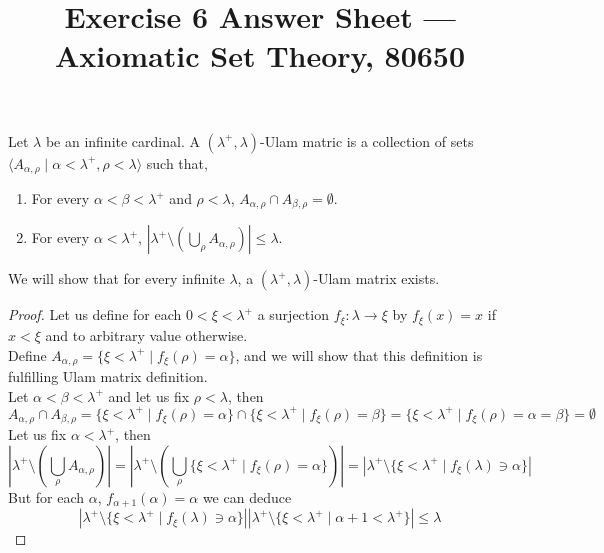 
\title{Exercise 6 Answer Sheet --- Axiomatic Set Theory, 80650}


\maketitle
\maketitleprint{}

\question{}
Let $\lambda$ be an infinite cardinal.
A $(\lambda^+, \lambda)$-Ulam matric is a collection of sets $\langle A_{\alpha, \rho} \mid \alpha < \lambda^+, \rho < \lambda \rangle$ such that,
\begin{enumerate}
	\item For every $\alpha < \beta < \lambda^+$ and $\rho < \lambda$, $A_{\alpha, \rho} \cap A_{\beta, \rho} = \emptyset$.
	\item For every $\alpha < \lambda^+$, $|\lambda^+ \setminus (\bigcup_\rho A_{\alpha, \rho})| \le \lambda$.
\end{enumerate}

\subquestion{}
We will show that for every infinite $\lambda$, a $(\lambda^+, \lambda)$-Ulam matrix exists.
\begin{proof}
	Let us define for each $0 < \xi < \lambda^+$ a surjection $f_\xi : \lambda \to \xi$ by $f_\xi(x) = x$ if $x < \xi$ and to arbitrary value otherwise. \\
	Define $A_{\alpha, \rho} = \{ \xi < \lambda^+ \mid f_\xi(\rho) = \alpha \}$, and we will show that this definition is fulfilling Ulam matrix definition. \\
	Let $\alpha < \beta < \lambda^+$ and let us fix $\rho < \lambda$, then
	\[
		A_{\alpha, \rho} \cap A_{\beta, \rho}
		= \{ \xi < \lambda^+ \mid f_\xi(\rho) = \alpha \} \cap \{ \xi < \lambda^+ \mid f_\xi(\rho) = \beta \}
		= \{ \xi < \lambda^+ \mid f_\xi(\rho) = \alpha = \beta \}
		= \emptyset
	\]
	Let us fix $\alpha < \lambda^+$, then
	\[
		\left\lvert \lambda^+ \setminus \left(\bigcup_\rho A_{\alpha, \rho}\right) \right\rvert
		= \left\lvert \lambda^+ \setminus \left(\bigcup_\rho \{ \xi < \lambda^+ \mid f_\xi(\rho) = \alpha \} \right) \right\rvert
		= \left\lvert \lambda^+ \setminus \{ \xi < \lambda^+ \mid f_\xi(\lambda) \ni \alpha \} \right\rvert
	\]
	But for each $\alpha$, $f_{\alpha + 1}(\alpha) = \alpha$ we can deduce
	\[
		\left\lvert \lambda^+ \setminus \{ \xi < \lambda^+ \mid f_\xi(\lambda) \ni \alpha \} \right\rvert
		\left\lvert \lambda^+ \setminus \{ \xi < \lambda^+ \mid \alpha + 1 < \lambda^+ \} \right\rvert
		\le \lambda
	\]
\end{proof}

